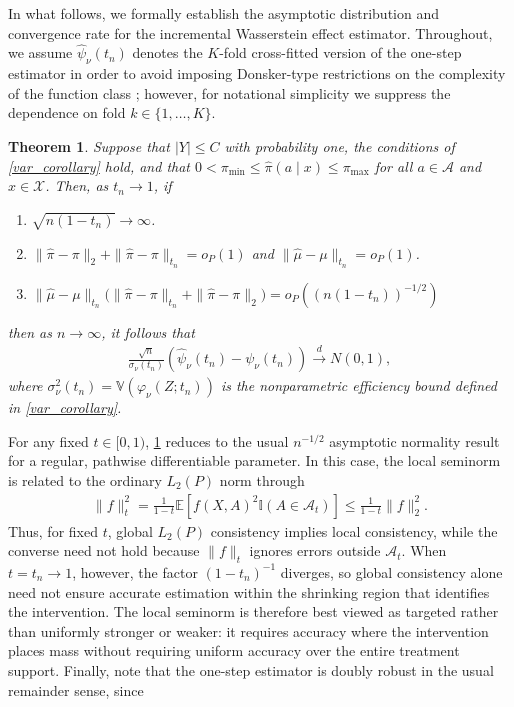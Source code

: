 \documentclass[11pt,twoside]{article}
\newtheorem{theorem}{Theorem}
\theoremstyle{definition}
\theoremstyle{remark}
\begin{document}
In what follows, we formally establish the asymptotic distribution and convergence rate for the incremental Wasserstein effect estimator. Throughout, we assume $\widehat{\psi}_\nu(t_n)$ denotes the $K$-fold cross-fitted version of the one-step estimator in order to avoid imposing Donsker-type restrictions on the complexity of the function class \citep{Chernozhukov2018}; however, for notational simplicity we suppress the dependence on fold $k \in \{1, \ldots, K \}$. 

\begin{theorem} \label{wasserstein_asymptotics}
    Suppose that $|Y| \leq C$ with probability one, the conditions of \cref{var_corollary} hold, and that $0 < \pi_{\min} \leq \widehat{\pi}(a \! \mid \! x) \leq \pi_{\max}$ for all $a \in \mathcal{A}$ and $x \in \mathcal{X}$. Then, as $t_n \to 1$, if
    \begin{enumerate}
        \item[$(i)$] $\sqrt{n(1-t_n)} \to \infty$.
        \item[$(ii)$]  $ \|\widehat{\pi} - \pi\|_2 + \|\widehat{\pi} - \pi\|_{t_n} = o_{P}(1)$ and  $\| \widehat{\mu} - \mu \|_{t_n} =  o_{P}(1)$.
        \item[$(iii)$] $ \| \widehat{\mu} - \mu \|_{t_n} \Big( \|\widehat{\pi} - \pi\|_{t_n} + \|\widehat{\pi} - \pi\|_2 \Big)   = o_{P}\left((n(1-t_n))^{-1/2}\right)$
    \end{enumerate}
    then as $n \to \infty$, it follows that
    \begin{align*}
        \frac{\sqrt{n}}{\sigma_\nu(t_n)}\left(\widehat{\psi}_\nu(t_n) - \psi_\nu(t_n) \right)\overset{d}{\longrightarrow}N(0,1),
    \end{align*}
where $\sigma^2_\nu(t_n) = \mathbb{V}(\varphi_\nu(Z;t_n))$ is the nonparametric efficiency bound defined in \cref{var_corollary}. 
\end{theorem}
For any fixed $t \in [0, 1)$, \cref{wasserstein_asymptotics} reduces to the 
usual $n^{-1/2}$ asymptotic normality result for a regular, pathwise differentiable parameter. 
In this case, the local seminorm is related to the ordinary $L_2(P)$ norm through
\begin{align*}
    \|f\|_t^2 = \frac{1}{1-t} \mathbb{E}[f(X,A)^2\mathbb{I}(A\in\mathcal{A}_t)] \leq \frac{1}{1-t}\|f\|_2^2.
\end{align*}
Thus, for fixed $t$, global $L_2(P)$ consistency implies local consistency, while the converse need not hold because $\|f\|_t$ ignores errors outside $\mathcal{A}_t$. When $t=t_n\to1$, however, the factor $(1-t_n)^{-1}$ diverges, so global consistency alone need not ensure accurate estimation within the shrinking region that identifies the intervention. The local seminorm is therefore best viewed as targeted rather than uniformly stronger or weaker: it requires accuracy where the intervention places mass without requiring uniform accuracy over the entire treatment support. Finally, note that the one-step estimator is doubly robust in the usual remainder sense, since 
\end{document}
